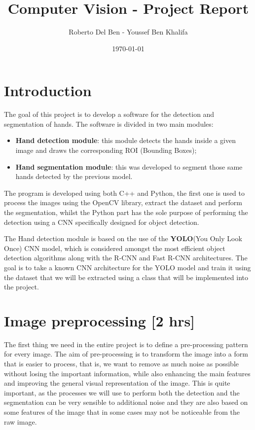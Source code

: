 
\title{Computer Vision - Project Report}
\author{Roberto Del Ben - Youssef Ben Khalifa}
\date{\today}

\maketitle \tableofcontents
\newpage

\section{Introduction}
The goal of this project is to develop a software for the detection and segmentation  of hands. The software is divided in two main modules:
\begin{itemize}
    \item \textbf{Hand detection module}: this module detects the hands inside a given image and draws the corresponding ROI (Bounding Boxes);
    \item \textbf{Hand segmentation module}: this was developed to segment those same hands detected by the previous model.
\end{itemize}

The program is developed using both C++ and Python, the first one is used to process the images using the OpenCV library, extract the dataset and perform
the segmentation, whilst the Python part has the sole purpose of performing the detection using a CNN specifically designed for object detection.

The Hand detection module is based on the use of the \textbf{YOLO}(You Only Look Once) CNN model, which is considered amongst the most efficient object detection algorithms
along with the R-CNN and Fast R-CNN architectures. The goal is to take a known CNN architecture for the YOLO model and train it using the dataset that we will be extracted using
a class that will be implemented into the project.

\section{Image preprocessing [2 hrs]}

The first thing we need in the entire project is to define a pre-processing
pattern for every image. The aim of pre-processing is to transform the image
into a form
that is easier to process, that is, we want to remove as much noise as possible
without losing the important information, while also enhancing the main
features and
improving the general visual representation of the image. This is quite
important, as the processes we will use to perform both the detection and the
segmentation
can be very sensible to additional noise and they are also based on some
features of the image that in some cases may not be noticeable from the raw
image.

